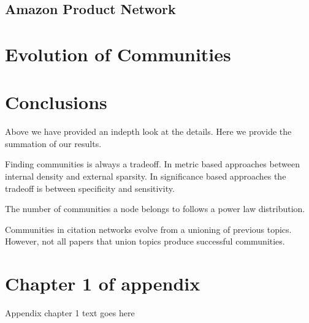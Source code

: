 \documentclass[phd,tocprelim]{cornell}
\begin{document}
\section{Amazon Product Network}

\chapter{Evolution of Communities}


\chapter{Conclusions}

Above we have provided an indepth look at the details.  Here we provide the summation of our results.

Finding communities is always a tradeoff.  In metric based approaches between internal density and external sparsity.  In significance based approaches the tradeoff is between specificity and sensitivity.

The number of communities a node belongs to follows a power law distribution.

Communities in citation networks evolve from a unioning of previous topics.  However, not all papers that union topics produce successful communities.


\appendix
\chapter{Chapter 1 of appendix}
Appendix chapter 1 text goes here


\end{document}
